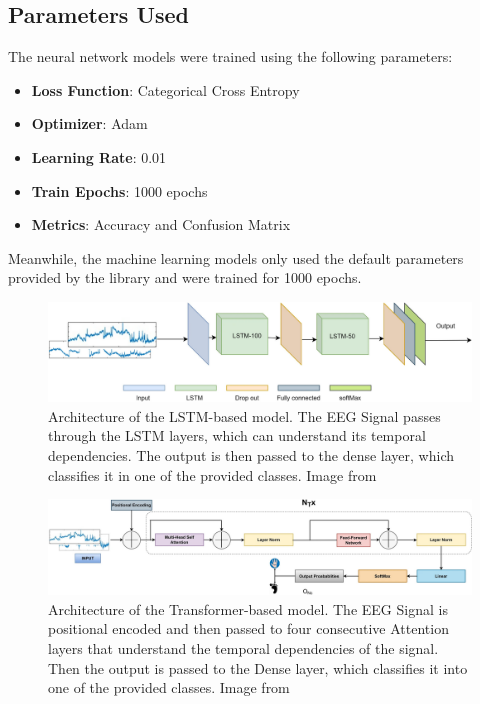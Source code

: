 \subsection*{Parameters Used}
The neural network models were trained using the following parameters:
\begin{itemize}
    \item \textbf{Loss Function}: Categorical Cross Entropy
    \item \textbf{Optimizer}: Adam
    \item \textbf{Learning Rate}: 0.01
    \item \textbf{Train Epochs}: 1000 epochs
    \item \textbf{Metrics}: Accuracy and Confusion Matrix
\end{itemize}
Meanwhile, the machine learning models only used the default parameters provided by the library and were trained for 1000 epochs.
\begin{figure}[!htbp]
    \centering
        \centering    
        \includegraphics[width=\textwidth]{Figures/Methodology/LSTM}
        \caption{Architecture of the LSTM-based model.
        The EEG Signal passes through the LSTM layers, which can understand its temporal dependencies. The output is then passed to the dense layer, which classifies it in one of the provided classes.
        Image from~\cite{sharma_deep_2023}}\label{fig:lstm_model}
\end{figure}
\begin{figure}[!htbp]
        \centering
        \includegraphics[width=\textwidth]{Figures/Methodology/Attention}
        \caption{Architecture of the Transformer-based model. 
        The EEG Signal is positional encoded and then passed to four consecutive Attention layers that understand the temporal dependencies of the signal. Then the output is passed to the Dense layer, which classifies it into one of the provided classes.
        Image from~\cite{sharma_deep_2023}}\label{fig:attention_model}
\end{figure}

